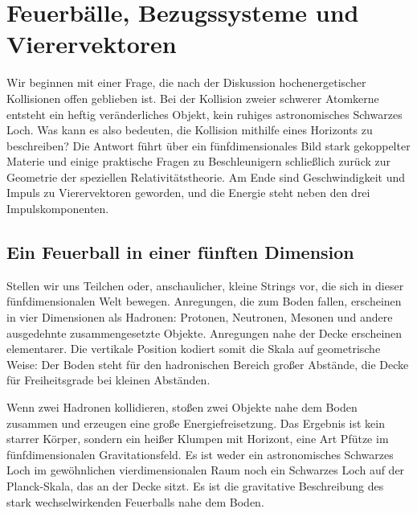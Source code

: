 \chapter{Feuerbälle, Bezugssysteme und Vierervektoren}

Wir beginnen mit einer Frage, die nach der Diskussion hochenergetischer Kollisionen offen geblieben ist. Bei der Kollision zweier schwerer Atomkerne entsteht ein heftig veränderliches Objekt, kein ruhiges astronomisches Schwarzes Loch. Was kann es also bedeuten, die Kollision mithilfe eines Horizonts zu beschreiben? Die Antwort führt über ein fünfdimensionales Bild stark gekoppelter Materie und einige praktische Fragen zu Beschleunigern schließlich zurück zur Geometrie der speziellen Relativitätstheorie. Am Ende sind Geschwindigkeit und Impuls zu Vierervektoren geworden, und die Energie steht neben den drei Impulskomponenten.

\section{Ein Feuerball in einer fünften Dimension}

\begin{classroomqa}
\end{classroomqa}

Stellen wir uns Teilchen oder, anschaulicher, kleine Strings vor, die sich in dieser fünfdimensionalen Welt bewegen. Anregungen, die zum Boden fallen, erscheinen in vier Dimensionen als Hadronen: Protonen, Neutronen, Mesonen und andere ausgedehnte zusammengesetzte Objekte. Anregungen nahe der Decke erscheinen elementarer. Die vertikale Position kodiert somit die Skala auf geometrische Weise: Der Boden steht für den hadronischen Bereich großer Abstände, die Decke für Freiheitsgrade bei kleinen Abständen.

Wenn zwei Hadronen kollidieren, stoßen zwei Objekte nahe dem Boden zusammen und erzeugen eine große Energiefreisetzung. Das Ergebnis ist kein starrer Körper, sondern ein heißer Klumpen mit Horizont, eine Art Pfütze im fünfdimensionalen Gravitationsfeld. Es ist weder ein astronomisches Schwarzes Loch im gewöhnlichen vierdimensionalen Raum noch ein Schwarzes Loch auf der Planck-Skala, das an der Decke sitzt. Es ist die gravitative Beschreibung des stark wechselwirkenden Feuerballs nahe dem Boden.

